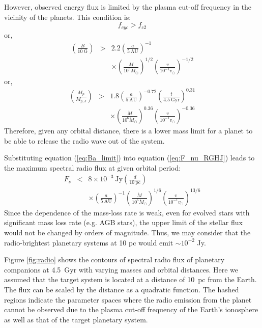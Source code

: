 \documentclass{emulateapj}
\begin{document}

However, observed energy flux is limited by the plasma cut-off frequency in the vicinity of the planets. 
This condition is:
\begin{equation}
 f_{cyc} > f_{c2}
\end{equation} 
or, 
\begin{eqnarray}
 \left( \frac{B}{10~\mbox{G}} \right) &>& 2.2 \left( \frac{a}{5~\mbox{AU}} \right)^{-1} \\
 && \times \left( \frac{\dot M}{10^6 \dot M_{\odot}} \right)^{1/2}  \left( \frac{v}{10^{-1}v_{\odot}} \right)^{-1/2} \label{eq:Ba_limit}
\end{eqnarray}
or, 
\begin{eqnarray}
 \left( \frac{M_p}{M_{p,J}} \right) &> & 1.8 \left( \frac{a}{5~\mbox{AU}} \right)^{-0.72} \left( \frac{t}{4.5~\mbox{Gyr}} \right)^{0.31} \\
 && \times \left( \frac{\dot M}{10^6 \dot M_{\odot}} \right)^{0.36}  \left( \frac{v}{10^{-1}v_{\odot}} \right)^{-0.36} \label{eq:Ma_limit}
\end{eqnarray}
% 
Therefore, given any orbital distance, there is a lower mass limit for a planet to be able to release the  radio wave out of the system. 

Substituting equation (\ref{eq:Ba_limit}) into equation (\ref{eq:F_nu_RGHJ}) leads to the maximum spectral radio flux at given orbital period:
\begin{eqnarray}
F_{\nu} &<& 8 \times 10^{-3}~\mbox{Jy} \left( \frac{d}{10~\mbox{pc}} \right) \\
&& \times \left( \frac{a}{5~\mbox{AU}} \right)^{-1}  \left( \frac{\dot M}{10^6 \dot M_{\odot}} \right)^{1/6} \left( \frac{v}{10^{-1} v_{\odot}} \right)^{13/6}
\end{eqnarray}
Since the dependence of the mass-loss rate is weak, even for evolved stars with significant mass loss rate (e.g. AGB stars), the upper limit of the stellar flux would not be changed by orders of magnitude. 
Thus, we may consider that the radio-brightest planetary systems at 10 pc would emit $\sim 10^{-2}$ Jy. 

Figure \ref{fig:radio} shows the contours of spectral radio flux of planetary companions at 4.5~Gyr with varying masses and orbital distances. Here we assumed that the target system is located at a distance of 10~pc from the Earth. The flux can be scaled by the distance as a quadratic function. 
The hashed regions indicate the parameter spaces where the radio emission from the planet cannot be observed due to the plasma cut-off frequency of the Earth's ionosphere as well as that of the target planetary system. 
\end{document}

